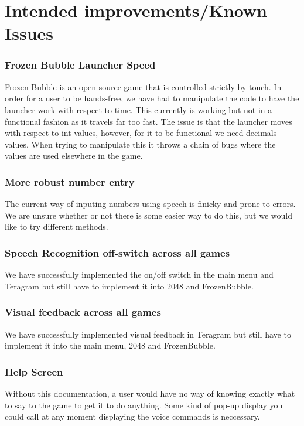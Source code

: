 \documentclass[11pt, oneside]{article}
\begin{document}
\pagebreak

\section{Intended improvements/Known Issues}

\subsubsection*{Frozen Bubble Launcher Speed}
Frozen Bubble is an open source game that is controlled strictly by touch. 
In order for a user to be hands-free, we have had to manipulate the code 
to have the launcher work with respect to time. This currently is working
but not in a functional fashion as it travels far too fast. The issue is 
that the launcher moves with respect to int values, however, for it to be 
functional we need decimals values. When trying to manipulate this it 
throws a chain of bugs where the values are used elsewhere in the game. 

\subsubsection*{More robust number entry}
The current way of inputing numbers using speech is finicky and prone to
errors. We are unsure whether or not there is some easier way to do this,
but we would like to try different methods.

\subsubsection*{Speech Recognition off-switch across all games}
We have successfully implemented the on/off switch in the main menu and 
Teragram but still have to implement it into 2048 and FrozenBubble.

\subsubsection*{Visual feedback across all games}
We have successfully implemented visual feedback in Teragram but still 
have to implement it into the main menu, 2048 and FrozenBubble.

\subsubsection*{Help Screen}
Without this documentation, a user would have no way of knowing exactly 
what to say to the game to get it to do anything. Some kind of pop-up 
display you could call at any moment displaying the voice commands is
neccessary. 
\end{document}
